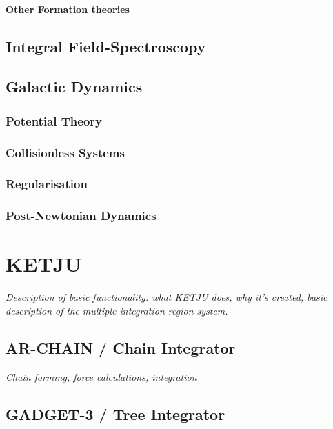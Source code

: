 \documentclass[english, oneside]{HYgradu}
\begin{document}
\subsubsection{Other Formation theories}

\section{Integral Field-Spectroscopy}

\section{Galactic Dynamics}

\subsection{Potential Theory}

\subsection{Collisionless Systems}

\subsection{Regularisation}

\subsection{Post-Newtonian Dynamics}

\chapter{KETJU}

\textit{Description of basic functionality: what KETJU does, why it's created, basic description of the multiple integration region system.} 

\section{AR-CHAIN / Chain Integrator}

\textit{Chain forming, force calculations, integration}

\section{GADGET-3 / Tree Integrator}
\end{document}

